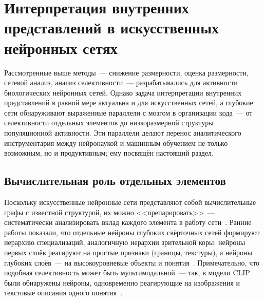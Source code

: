 
\section{Интерпретация внутренних представлений в искусственных нейронных сетях}\label{sec:lit_ann_repr}


Рассмотренные выше методы~--- снижение размерности, оценка размерности, сетевой анализ, анализ селективности~--- разрабатывались для активности биологических нейронных сетей. Однако задача интерпретации внутренних представлений в равной мере актуальна и для искусственных сетей, а глубокие сети обнаруживают выраженные параллели с мозгом в организации кода~--- от селективности отдельных элементов до низкоразмерной структуры популяционной активности. Эти параллели делают перенос аналитического инструментария между нейронаукой и машинным обучением не только возможным, но и продуктивным; ему посвящён настоящий раздел.

\subsection{Вычислительная роль отдельных элементов}\label{sec:ann_individual}

Поскольку искусственные нейронные сети представляют собой вычислительные графы с известной структурой, их можно <<препарировать>>~--- систематически анализировать вклад каждого элемента в работу сети~\cite{bau2017network, Olah2017}. Ранние работы показали, что отдельные нейроны глубоких свёрточных сетей формируют иерархию специализаций, аналогичную иерархии зрительной коры: нейроны первых слоёв реагируют на простые признаки (границы, текстуры), а нейроны глубоких слоёв~--- на высокоуровневые объекты и понятия~\cite{erhan2009visualizing, Olah2017}. Примечательно, что подобная селективность может быть мультимодальной~--- так, в модели CLIP были обнаружены нейроны, одновременно реагирующие на изображения и текстовые описания одного понятия~\cite{goh2021multimodal}.

